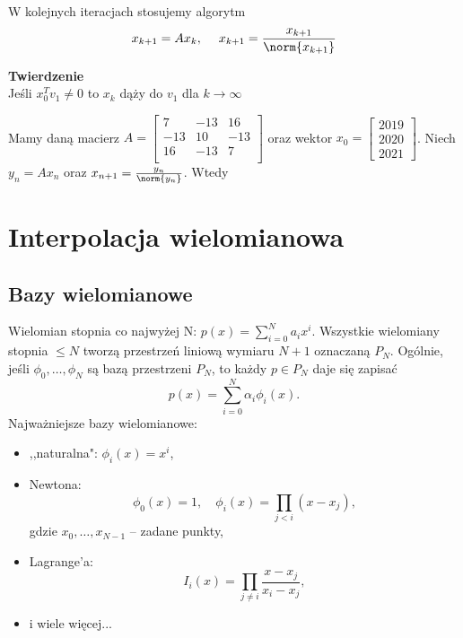 W kolejnych iteracjach stosujemy algorytm
$$
x_{k+1} = Ax_{k}, \quad \;
x_{k+1} = \frac{x_{k+1}}{\norm{x_{k+1}}}
$$

\textbf{Twierdzenie}\\
Jeśli $x_0^Tv_1 \neq 0$ to $x_k$ dąży do $v_1$ dla $k \to \infty$




\begin{problems}

    \prob Mamy daną macierz $A = \begin{bmatrix}
        7 & -13 & 16\\
        -13 & 10 & -13\\
        16 & -13 & 7 \\
    \end{bmatrix}$
    oraz wektor $x_0 = \begin{bmatrix}
        2019 \\
        2020 \\
        2021 
    \end{bmatrix}$. Niech $y_n = A x_{n}$ oraz $ x_{n+1} = \frac{y_{n}}{\norm{y_{n}}}$. Wtedy
\end{problems}

\section{Interpolacja wielomianowa}

\subsection{Bazy wielomianowe}
Wielomian stopnia co najwyżej N: $p(x)=\sum_{i=0}^N a_ix^i$. Wszystkie wielomiany stopnia $\leq N$ tworzą przestrzeń liniową wymiaru $N+1$ oznaczaną $P_N$. Ogólnie, jeśli $\phi_0,\ldots,\phi_N$ są bazą przestrzeni $P_N$, to każdy $p\in P_N$ daje się zapisać
$$
p(x) = \sum_{i=0}^N\alpha_i\phi_i(x).
$$
Najważniejsze bazy wielomianowe:
\begin{itemize}
    \item ,,naturalna": $\phi_i(x)=x^i$,
    \item Newtona:
    $$
    \phi_0(x)=1, \quad \phi_i(x) = \prod_{j<i}(x-x_j),
    $$
    gdzie $x_0,\ldots,x_{N-1}$ -- zadane punkty,
    \item Lagrange'a:
    $$
    I_i(x)=\prod_{j\neq i}\frac{x-x_j}{x_i-x_j},
    $$
    \item i wiele więcej...
\end{itemize}

